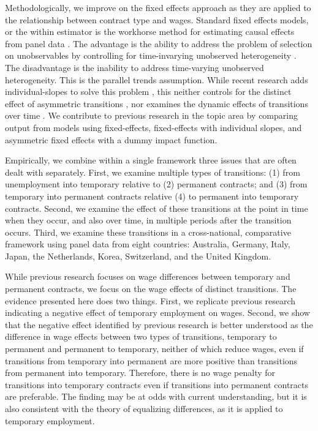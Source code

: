 \documentclass[12pt]{article}
\begin{document}
Methodologically, we improve on the fixed effects approach as they are applied to the relationship between contract type and wages.  Standard fixed effects models, or the within estimator is the workhorse method for estimating causal effects from panel data \citep{wooldridge2005fixed,imai2021use}.  The advantage is the ability to address the problem of selection on unobservables by controlling for time-invarying unobserved heterogeneity \citep{halaby_panel_2004,gangl_causal_2010}.  The disadvantage is the inability to address time-varying unobserved heterogeneity.  This is the parallel trends assumption.  While recent research adds individual-slopes to solve this problem \citep{ludwig_is_2018}, this neither controls for the distinct effect of asymmetric transitions \citep{allison_asymmetric_2019}, nor examines the dynamic effects of transitions over time \citep{andres_applied_2013,ludwig_what_2021}.  We contribute to previous research in the topic area by comparing output from models using fixed-effects, fixed-effects with individual slopes, and asymmetric fixed effects with a dummy impact function.  

Empirically, we combine within a single framework three issues that are often dealt with separately.  First, we examine multiple types of transitions: (1) from unemployment into temporary relative to (2) permanent contracts; and (3) from temporary into permanent contracts relative (4) to permanent into temporary contracts.  Second, we examine the effect of these transitions at the point in time when they occur, and also over time, in multiple periods after the transition occurs.  Third, we examine these transitions in a cross-national, comparative framework using panel data from eight countries: Australia, Germany, Italy, Japan, the Netherlands, Korea, Switzerland, and the United Kingdom.  

While previous research focuses on wage differences between temporary and permanent contracts, we focus on the wage effects of distinct transitions.  The evidence presented here does two things.  First, we replicate previous research indicating a negative effect of temporary employment on wages.  Second, we show that the negative effect identified by previous research is better understood as the difference in wage effects between two types of transitions, temporary to permanent and permanent to temporary, neither of which reduce wages, even if transitions from temporary into permanent are more positive than transitions from permanent into temporary.  Therefore, there is no wage penalty for transitions into temporary contracts even if transitions into permanent contracts are preferable.  The finding may be at odds with current understanding, but it is also consistent with the theory of equalizing differences, as it is applied to temporary employment.  
\end{document}
